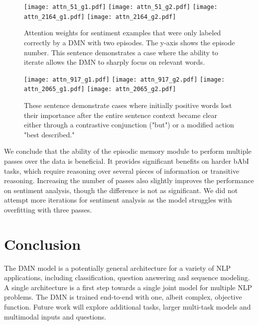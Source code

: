 \documentclass{article}
\begin{document}
\begin{figure}[t!]
\vspace{-0.3cm}
  \centering
  \texttt{[image: attn\_51\_g1.pdf]}
  \texttt{[image: attn\_51\_g2.pdf]}
  \texttt{[image: attn\_2164\_g1.pdf]}
  \texttt{[image: attn\_2164\_g2.pdf]}
  \vspace{-0.3cm}
  \caption{Attention weights for sentiment examples that were only labeled correctly by a DMN with two episodes. The y-axis shows the episode number. This sentence demonstrates a case where the ability to iterate allows the DMN to sharply focus on relevant words.}
  \label{sent:focus}
\end{figure}

\begin{figure}[t!]
\vspace{-0.3cm}
  \centering
  \texttt{[image: attn\_917\_g1.pdf]}
  \texttt{[image: attn\_917\_g2.pdf]}
  \texttt{[image: attn\_2065\_g1.pdf]}
  \texttt{[image: attn\_2065\_g2.pdf]}
  \vspace{-0.3cm}
  \caption{These sentence demonstrate cases where initially positive words lost their importance after the entire sentence context became clear either through a contrastive conjunction ("but") or a modified action "best described."}
  \label{sent:neg}
\vspace{-0.4cm}
\end{figure}


We conclude that the ability of the episodic memory module to perform multiple passes over the data is beneficial. It provides significant benefits on harder bAbI tasks, which require reasoning over several pieces of information or transitive reasoning. Increasing the number of passes also slightly improves the performance on sentiment analysis, though the difference is not as significant. We did not attempt more iterations for sentiment analysis as the model struggles with overfitting with three passes.


\section{Conclusion}
The DMN model is a potentially general architecture for a variety of NLP applications, including classification, question answering and sequence modeling. A single architecture is a first step towards a single joint model for multiple NLP problems. The DMN is trained end-to-end with one, albeit complex, objective function. Future work will explore additional tasks, larger multi-task models and multimodal inputs and questions.  








\end{document}
